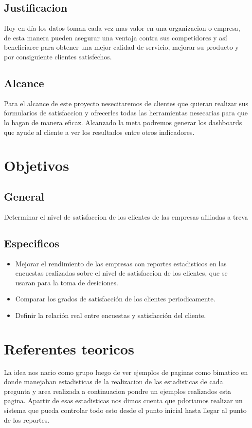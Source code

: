 \documentclass[twoside,twocolumn]{article}
\begin{document}
\subsection{Justificacion}
Hoy en día los datos toman cada vez mas valor en una organizacion o empresa, de esta manera pueden asegurar una ventaja contra sus competidores y así beneficiarce para obtener una mejor calidad de servicio, mejorar su producto y por consiguiente clientes satisfechos.

\subsection{Alcance}
Para el alcance de este proyecto nesecitaremos de clientes que quieran realizar sus formularios de satisfaccion y ofrecerles todas las herramientas nesecarias para que lo hagan de manera eficaz. Alcanzado la meta podremos generar los dashboards que ayude al cliente a ver los resultados entre otros indicadores.


\section{Objetivos}
\subsection{General}
Determinar el nivel de satisfaccion de los clientes de las empresas afiliadas a treva

\subsection{Especificos}
\begin{itemize}
\item Mejorar el rendimiento de las empresas con reportes estadisticos en las encuestas realizadas sobre el nivel de satisfaccion de los clientes, que se usaran para la toma de desiciones.
\item Comparar los grados de satisfacción de los clientes periodicamente.
\item Definir la relación real entre encuestas y satisfacción del cliente.
\end{itemize}

\section{Referentes teoricos}
La idea nos nacio como grupo luego de ver ejemplos de paginas como bimatico en donde manejaban estadisticas de la realizacion de las estadisticas de cada pregunta y area realizada
a continuacion pondre un ejemplos realizados esta pagina. Apartir de esas estadisticas nos dimos cuenta que pdoriamos realizar un sistema que pueda controlar todo esto desde el punto inicial hasta llegar al punto de los reportes.
\end{document}
